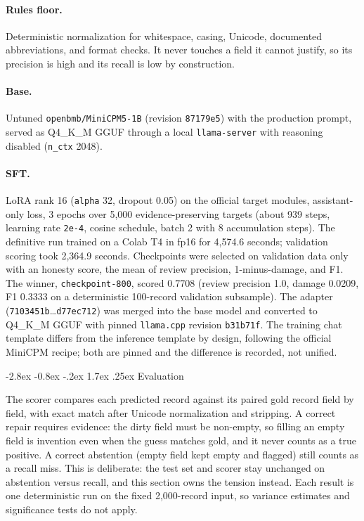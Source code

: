 \documentclass[11pt]{article}
\makeatletter
\renewcommand\section{\@startsection{section}{1}{\z@}%
  {-2.8ex \@plus -0.8ex \@minus -.2ex}%
  {1.7ex \@plus .25ex}%
  {\normalfont\Large\bfseries}}
\makeatother
\begin{document}
\paragraph{Rules floor.} Deterministic normalization for whitespace,
casing, Unicode, documented abbreviations, and format checks. It never
touches a field it cannot justify, so its precision is high and its
recall is low by construction.

\paragraph{Base.} Untuned \texttt{openbmb/MiniCPM5-1B} (revision
\texttt{87179e5}) with the production prompt, served as Q4\_K\_M GGUF
through a local \texttt{llama-server} with reasoning disabled
(\texttt{n\_ctx} 2048).

\paragraph{SFT.} LoRA rank 16 (\texttt{alpha} 32, dropout 0.05) on the
official target modules, assistant-only loss, 3 epochs over 5,000
evidence-preserving targets (about 939 steps, learning rate
\texttt{2e-4}, cosine schedule, batch 2 with 8 accumulation steps).
The definitive run trained on a Colab T4 in fp16 for 4,574.6 seconds;
validation scoring took 2,364.9 seconds. Checkpoints were selected on
validation data only with an honesty score, the mean of review
precision, 1-minus-damage, and F1. The winner,
\texttt{checkpoint-800}, scored 0.7708 (review precision 1.0, damage
0.0209, F1 0.3333 on a deterministic 100-record validation
subsample). The adapter
(\texttt{7103451b}\dots\texttt{d77ec712}) was merged into the base
model and converted to Q4\_K\_M GGUF with pinned \texttt{llama.cpp}
revision \texttt{b31b71f}. The training chat template differs from the
inference template by design, following the official MiniCPM recipe;
both are pinned and the difference is recorded, not unified.

\section{Evaluation}
\label{sec:eval}

The scorer compares each predicted record against its paired gold
record field by field, with exact match after Unicode normalization
and stripping. A correct repair requires evidence: the dirty field
must be non-empty, so filling an empty field is invention even when
the guess matches gold, and it never counts as a true positive. A
correct abstention (empty field kept empty and flagged) still counts
as a recall miss. This is deliberate: the test set and scorer stay
unchanged on abstention versus recall, and this section owns the
tension instead. Each result is one deterministic run on the fixed
2,000-record input, so variance estimates and significance tests do
not apply.
\end{document}
